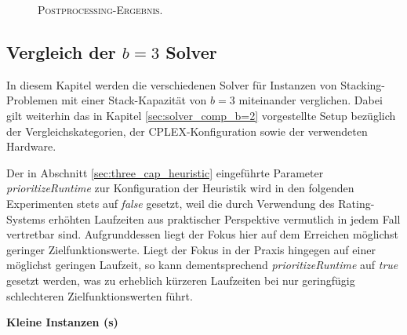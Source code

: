 \begin{figure}[H]
  \centering
    \caption{\textsc{Postprocessing-Ergebnis.}}
    \label{fig:valid_solution_post_processing}
\end{figure}

\subsection{Vergleich der $b = 3$ Solver}
\label{sec:solver_comp_b=3}

In diesem Kapitel werden die verschiedenen Solver für Instanzen von Stacking-Problemen mit einer Stack-Kapazität
von $b = 3$ miteinander verglichen. Dabei gilt weiterhin das in Kapitel \ref{sec:solver_comp_b=2} vorgestellte Setup
bezüglich der Vergleichskategorien, der \textsc{CPLEX}-Konfiguration sowie der verwendeten Hardware.

Der in Abschnitt \ref{sec:three_cap_heuristic} eingeführte Parameter \textit{prioritizeRuntime} zur Konfiguration der Heuristik
wird in den folgenden Experimenten stets auf \textit{false} gesetzt, weil die durch Verwendung des Rating-Systems erhöhten Laufzeiten
aus praktischer Perspektive vermutlich in jedem Fall vertretbar sind. Aufgrunddessen liegt der Fokus hier auf dem Erreichen
möglichst geringer Zielfunktionswerte. Liegt der Fokus in der Praxis hingegen auf einer möglichst geringen Laufzeit, so kann dementsprechend
\textit{prioritizeRuntime} auf \textit{true} gesetzt werden, was zu erheblich kürzeren Laufzeiten bei nur geringfügig schlechteren
Zielfunktionswerten führt.

\pagebreak

\textbf{Kleine Instanzen (s)}

